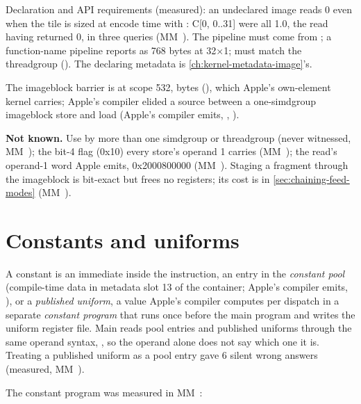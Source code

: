 Declaration and API requirements (measured): an undeclared image reads 0 even when the tile is sized at encode time with
: C{[}0, 0..31{]} were all 1.0, the read having returned 0, in three queries (MM~). The pipeline
must come from ; a function-name pipeline reports
 as 768 bytes at 32×1;  must match the threadgroup
(). The declaring metadata is \cref{ch:kernel-metadata-image}'s.

The imageblock barrier is  at scope 532, bytes 
(), which Apple's own-element kernel carries; Apple's compiler elided a
source  between a one-simdgroup imageblock store and load (Apple's compiler emits,
, ).

\textbf{Not known.} Use by more than one simdgroup or threadgroup (never witnessed, MM~); the bit-4 flag (0x10)
every store's operand 1 carries (MM~); the read's operand-1 word Apple emits, 0x2000800000 (MM~). Staging a
fragment through the imageblock is bit-exact but frees no registers; its cost is in \cref{sec:chaining-feed-modes} (MM~).

\section{Constants and uniforms}\label{sec:constants-uniforms}

A constant is an immediate inside the instruction, an entry in the \emph{constant pool}
(compile-time data in metadata slot 13 of the container; Apple's compiler emits, ), or a
\emph{published uniform}, a value Apple's compiler computes per dispatch in a separate \emph{constant program} that runs once before the main
program and writes the uniform register file. Main reads pool entries and published uniforms through the same operand
syntax, , so the operand alone does not say which one it is. Treating a published uniform as a
pool entry gave 6 silent wrong answers (measured, MM~).

The constant program was measured in MM~:

